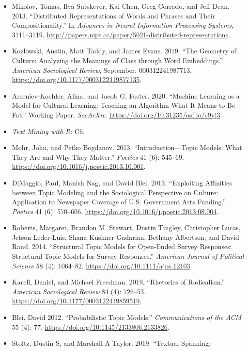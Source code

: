 \documentclass[
  10pt,
]{article}
\providecommand{\tightlist}{%
  \setlength{\itemsep}{0pt}\setlength{\parskip}{0pt}}
\begin{document}
\begin{itemize}
\tightlist
\item
  Mikolov, Tomas, Ilya Sutskever, Kai Chen, Greg Corrado, and Jeff Dean.
  2013. ``Distributed Representations of Words and Phrases and Their
  Compositionality.'' In \emph{Advances in Neural Information Processing
  Systems}, 3111--3119.
  \url{http://papers.nips.cc/paper/5021-distributed-representations}.
\item
  Kozlowski, Austin, Matt Taddy, and James Evans. 2019. ``The Geometry
  of Culture: Analyzing the Meanings of Class through Word Embeddings.''
  \emph{American Sociological Review}, September, 000312241987713.
  \url{https://doi.org/10.1177/0003122419877135}.
\item
  Arseniev-Koehler, Alina, and Jacob G. Foster. 2020. ``Machine Learning
  as a Model for Cultural Learning: Teaching an Algorithm What It Means
  to Be Fat.'' Working Paper. \emph{SocArXiv}.
  \url{https://doi.org/10.31235/osf.io/c9yj3}.
\item
  \emph{Text Mining with R}: C6.
\item
  Mohr, John, and Petko Bogdanov. 2013. ``Introduction---Topic Models:
  What They Are and Why They Matter.'' \emph{Poetics} 41 (6): 545--69.
  \url{https://doi.org/10.1016/j.poetic.2013.10.001}.
\item
  DiMaggio, Paul, Manish Nag, and David Blei. 2013. ``Exploiting
  Affinities between Topic Modeling and the Sociological Perspective on
  Culture: Application to Newspaper Coverage of U.S. Government Arts
  Funding.'' \emph{Poetics} 41 (6): 570--606.
  \url{https://doi.org/10.1016/j.poetic.2013.08.004}.
\item
  Roberts, Margaret, Brandon M. Stewart, Dustin Tingley, Christopher
  Lucas, Jetson Leder-Luis, Shana Kushner Gadarian, Bethany Albertson,
  and David Rand. 2014. ``Structural Topic Models for Open-Ended Survey
  Responses: Structural Topic Models for Survey Responses.''
  \emph{American Journal of Political Science} 58 (4): 1064--82.
  \url{https://doi.org/10.1111/ajps.12103}.
\item
  Karell, Daniel, and Michael Freedman. 2019. ``Rhetorics of
  Radicalism.'' \emph{American Sociological Review} 84 (4): 726--53.
  \url{https://doi.org/10.1177/0003122419859519}.
\item
  Blei, David 2012. ``Probabilistic Topic Models.'' \emph{Communications
  of the ACM} 55 (4): 77. \url{https://doi.org/10.1145/2133806.2133826}.
\item
  Stoltz, Dustin S, and Marshall A Taylor. 2019. ``Textual Spanning:

\end{itemize}
\end{document}
